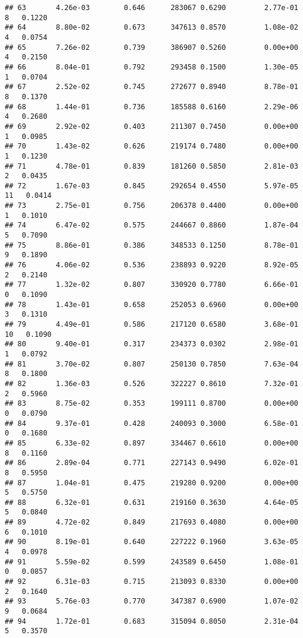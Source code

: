 \documentclass[
]{article}
\begin{document}
\begin{verbatim}
## 63       4.26e-03        0.646      283067 0.6290         2.77e-01   8   0.1220
## 64       8.80e-02        0.673      347613 0.8570         1.08e-02   4   0.0754
## 65       7.26e-02        0.739      386907 0.5260         0.00e+00   4   0.2150
## 66       8.04e-01        0.792      293458 0.1500         1.30e-05   1   0.0704
## 67       2.52e-02        0.745      272677 0.8940         8.78e-01   8   0.1370
## 68       1.44e-01        0.736      185588 0.6160         2.29e-06   4   0.2680
## 69       2.92e-02        0.403      211307 0.7450         0.00e+00   1   0.0985
## 70       1.43e-02        0.626      219174 0.7480         0.00e+00   1   0.1230
## 71       4.78e-01        0.839      181260 0.5850         2.81e-03   2   0.0435
## 72       1.67e-03        0.845      292654 0.4550         5.97e-05  11   0.0414
## 73       2.75e-01        0.756      206378 0.4400         0.00e+00   1   0.1010
## 74       6.47e-02        0.575      244667 0.8860         1.87e-04   5   0.7090
## 75       8.86e-01        0.386      348533 0.1250         8.78e-01   9   0.1890
## 76       4.06e-02        0.536      238893 0.9220         8.92e-05   2   0.2140
## 77       1.32e-02        0.807      330920 0.7780         6.66e-01   0   0.1090
## 78       1.43e-01        0.658      252053 0.6960         0.00e+00   3   0.1310
## 79       4.49e-01        0.586      217120 0.6580         3.68e-01  10   0.1090
## 80       9.40e-01        0.317      234373 0.0302         2.98e-01   1   0.0792
## 81       3.70e-02        0.807      250130 0.7850         7.63e-04   8   0.1800
## 82       1.36e-03        0.526      322227 0.8610         7.32e-01   2   0.5960
## 83       8.75e-02        0.353      199111 0.8700         0.00e+00   0   0.0790
## 84       9.37e-01        0.428      240093 0.3000         6.58e-01   0   0.1680
## 85       6.33e-02        0.897      334467 0.6610         0.00e+00   8   0.1160
## 86       2.89e-04        0.771      227143 0.9490         6.02e-01   8   0.5950
## 87       1.04e-01        0.475      219280 0.9200         0.00e+00   5   0.5750
## 88       6.32e-01        0.631      219160 0.3630         4.64e-05   5   0.0840
## 89       4.72e-02        0.849      217693 0.4080         0.00e+00   6   0.1010
## 90       8.19e-01        0.640      227222 0.1960         3.63e-05   4   0.0978
## 91       5.59e-02        0.599      243589 0.6450         1.08e-01   0   0.0857
## 92       6.31e-03        0.715      213093 0.8330         0.00e+00   2   0.1640
## 93       5.76e-03        0.770      347387 0.6900         1.07e-02   9   0.0684
## 94       1.72e-01        0.683      315094 0.8050         2.31e-04   5   0.3570

\end{verbatim}
\end{document}

